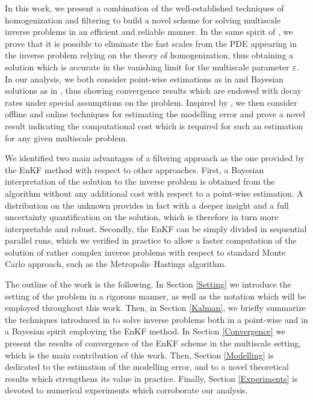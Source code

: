 \documentclass[10pt]{article}
\begin{document}
In this work, we present a combination of the well-established techniques of homogenization and filtering to build a novel scheme for solving multiscale inverse problems in an efficient and reliable manner. In the same spirit of \cite{AbD17, AbD18}, we prove that it is possible to eliminate the fast scales from the PDE appearing in the inverse problem relying on the theory of homogenization, thus obtaining a solution which is accurate in the vanishing limit for the multiscale parameter $\varepsilon$. In our analysis, we both consider point-wise estimations as in \cite{ILS13} and Bayesian solutions as in \cite{ScS17}, thus showing convergence results which are endowed with decay rates under special assumptions on the problem. Inspired by \cite{CES14, CDS18, AbD18}, we then consider offline and online techniques for estimating the modelling error and prove a novel result indicating the computational cost which is required for such an estimation for any given multiscale problem. 

We identified two main advantages of a filtering approach as the one provided by the EnKF method with respect to other approaches. First, a Bayesian interpretation of the solution to the inverse problem is obtained from the algorithm without any additional cost with respect to a point-wise estimation. A distribution on the unknown provides in fact with a deeper insight and a full uncertainty quantification on the solution, which is therefore in turn more interpretable and robust. Secondly, the EnKF can be simply divided in sequential parallel runs, which we verified in practice to allow a faster computation of the solution of rather complex inverse problems with respect to standard Monte Carlo approach, such as the Metropolis--Hastings algorithm.  

The outline of the work is the following. In Section \ref{Setting} we introduce the setting of the problem in a rigorous manner, as well as the notation which will be employed throughout this work. Then, in Section \ref{Kalman}, we briefly summarize the techniques introduced in \cite{ILS13, ScS17} to solve inverse problems both in a point-wise and in a Bayesian spirit employing the EnKF method. In Section \ref{Convergence} we present the results of convergence of the EnKF scheme in the multiscale setting, which is the main contribution of this work. Then, Section \ref{Modelling} is dedicated to the estimation of the modelling error, and to a novel theoretical results which strengthens its value in practice. Finally, Section \ref{Experiments} is devoted to numerical experiments which corroborate our analysis.
\end{document}
